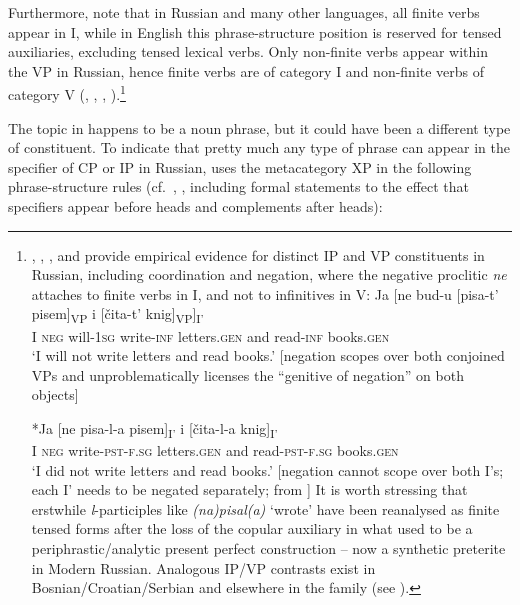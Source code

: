 \documentclass[output=paper,hidelinks]{langscibook}
\begin{document}
Furthermore, note that in Russian and many other languages, all finite verbs appear in I, while in English this phrase-structure position is reserved for tensed auxiliaries, excluding tensed lexical verbs. Only non-finite verbs appear within the VP in Russian, hence finite verbs are of category I and non-finite verbs of category V (\citealt{King1994,King95}, \citealt[53--54, 61--62]{dalrymple01}, \citealt[102, 104, 109, 147--150, 199--209]{BresnanEtAl2016}, \citealt[99--100, 108ff., 119]{DLM:LFG}).\footnote{\label{fn:Slavic:8}\citet{King1994}, \citet[esp.\ Chapter 3]{King95}, \citet[62--63]{dalrymple01}, \citet[201--203]{BresnanEtAl2016} and \citet[110]{DLM:LFG} provide empirical evidence for distinct IP and VP constituents in Russian, including coordination and negation, where the negative proclitic \textit{ne} attaches to finite verbs in I, and not to infinitives in V:
\ea\gll
Ja   [ne   bud-u     [pisa-t'     pisem]\textsubscript{VP} i   [čita-t'     knig]\textsubscript{VP}]\textsubscript{I'}\\
I \textsc{neg} will-\textsc{1sg} write-\textsc{inf} letters.\textsc{gen} and   read-\textsc{inf} books.\textsc{gen}\\
\glt`I will not write letters and read books.'   [negation scopes over both conjoined VPs and unproblematically licenses the ``genitive of negation'' on both objects]
\z

\ea\gll
*Ja    [ne   pisa-l-a     pisem]\textsubscript{I'} i   [čita-l-a   knig]\textsubscript{I'}\\
I \textsc{neg} write-\textsc{pst-f.sg} letters.\textsc{gen} and read-\textsc{pst-f.sg} books.\textsc{gen}\\
\glt`I did not write letters and read books.'   [negation cannot scope over both I's; each I' needs to be negated separately; from \citet[42--43, 184ff.]{King95}]
\z
It is worth stressing that erstwhile \textit{l}-participles like \textit{(na)pisal(a)} `wrote' have been reanalysed as finite tensed forms after the loss of the copular auxiliary in what used to be a periphrastic/analytic present perfect construction -- now a synthetic preterite in Modern Russian. Analogous IP/VP contrasts exist in Bosnian/Croatian/Serbian and elsewhere in the family (see \citealt[41, fn.\ 31]{King95}).}

The topic in  happens to be a noun phrase, but it could have been a different type of constituent. To indicate that pretty much any type of phrase can appear in the specifier of CP or IP in Russian, \citet[171, 197--198]{King95} uses the metacategory XP in the following phrase-structure rules (cf.\ \citealt[94, 96--97]{dalrymple01}, \citealt[141--142, 144--145]{DLM:LFG}, including formal statements to the effect that specifiers appear before heads and complements after heads):
\end{document}
